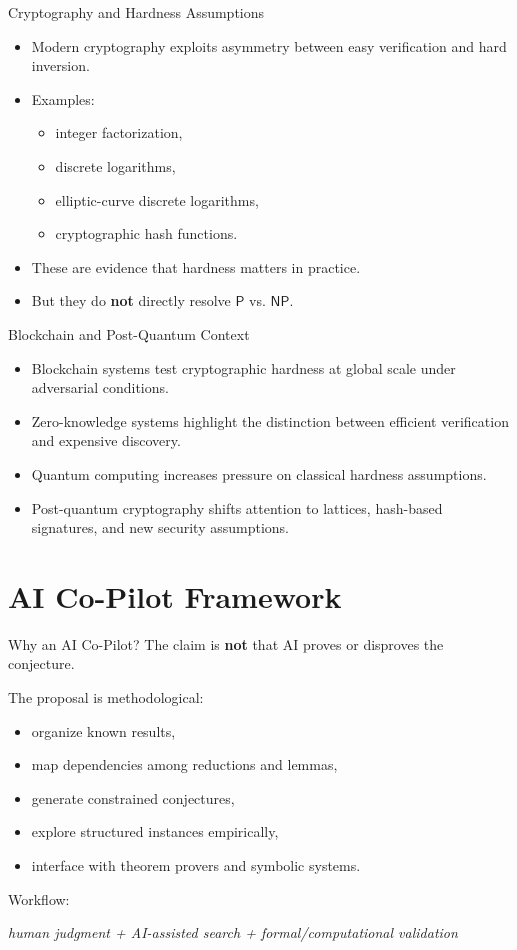 \documentclass[aspectratio=43]{beamer}
\begin{document}
\begin{frame}{Cryptography and Hardness Assumptions}
\begin{itemize}
    \item Modern cryptography exploits asymmetry between easy verification and hard inversion.
    \item Examples:
    \begin{itemize}
        \item integer factorization,
        \item discrete logarithms,
        \item elliptic-curve discrete logarithms,
        \item cryptographic hash functions.
    \end{itemize}
    \item These are evidence that hardness matters in practice.
    \item But they do \textbf{not} directly resolve $\mathsf{P}$ vs. $\mathsf{NP}$.
\end{itemize}
\end{frame}

\begin{frame}{Blockchain and Post-Quantum Context}
\begin{itemize}
    \item Blockchain systems test cryptographic hardness at global scale under adversarial conditions.
    \item Zero-knowledge systems highlight the distinction between efficient verification and expensive discovery.
    \item Quantum computing increases pressure on classical hardness assumptions.
    \item Post-quantum cryptography shifts attention to lattices, hash-based signatures, and new security assumptions.
\end{itemize}
\end{frame}

\section{AI Co-Pilot Framework}

\begin{frame}{Why an AI Co-Pilot?}
The claim is \textbf{not} that AI proves or disproves the conjecture.

\medskip
The proposal is methodological:
\begin{itemize}
    \item organize known results,
    \item map dependencies among reductions and lemmas,
    \item generate constrained conjectures,
    \item explore structured instances empirically,
    \item interface with theorem provers and symbolic systems.
\end{itemize}

\medskip
Workflow:
\begin{center}
\emph{human judgment + AI-assisted search + formal/computational validation}
\end{center}
\end{frame}
\end{document}
